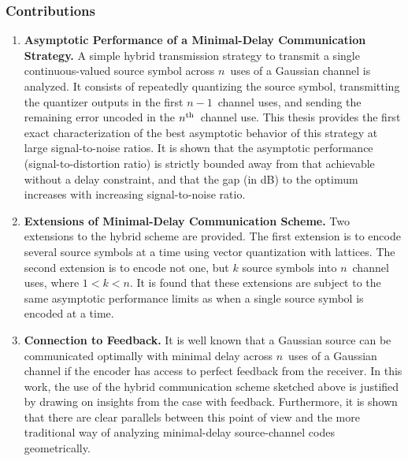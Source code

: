 \subsubsection{Contributions}

\begin{enumerate}

  \item \textbf{Asymptotic Performance of a Minimal-Delay Communication
    Strategy.} A simple hybrid transmission strategy to transmit a single
    continuous-valued source symbol across $n$~uses of a Gaussian channel is
    analyzed. It consists of repeatedly quantizing the source symbol,
    transmitting the quantizer outputs in the first $n-1$~channel uses, and
    sending the remaining error uncoded in the $n{^{\text{th}}}$~channel use. This thesis
    provides the first exact characterization of the best asymptotic behavior of
    this strategy at large signal-to-noise ratios. It is shown that the
    asymptotic performance (signal-to-distortion ratio) is strictly bounded away
    from that achievable without a delay constraint, and that the gap (in dB) to
    the optimum increases with increasing signal-to-noise ratio.

  \item \textbf{Extensions of Minimal-Delay Communication Scheme.} Two
    extensions to the hybrid scheme are provided. The first extension is to
    encode several source symbols at a time using vector quantization with
    lattices. The second extension is to encode not one, but $k$ source symbols
    into $n$~channel uses, where $1 < k < n$. It is found that these extensions
    are subject to the same asymptotic performance limits as when a single
    source symbol is encoded at a time.

  \item \textbf{Connection to Feedback.} It is well known that a Gaussian source
    can be communicated optimally with minimal delay across $n$~uses of a
    Gaussian channel if the encoder has access to perfect feedback from the
    receiver. In this work,  the use of the hybrid communication scheme sketched
    above is justified by drawing on insights from the case with feedback.
    Furthermore, it is shown that there are clear parallels between this point
    of view and the more traditional way of analyzing minimal-delay
    source-channel codes geometrically. 


\end{enumerate}
